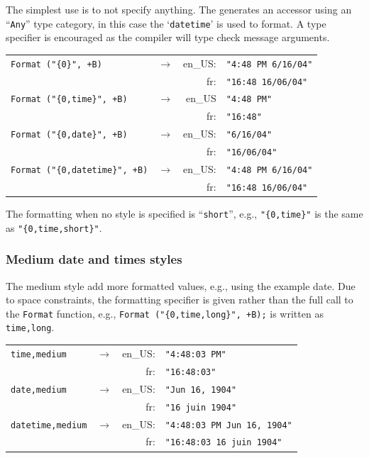 The simplest use is to not specify anything.  The generates an accessor
using an ``\texttt{Any}'' type category, in this case the `\texttt{datetime}'
is used to format.  A type specifier is encouraged as the compiler will type
check message arguments.
\begin{center}
\begin{tabular}{llrl}
\verb|Format ("{0}", +B)| & $\rightarrow$ &
                              en\_US: & \verb|"4:48 PM 6/16/04"|\\
                          & & fr: & \verb|"16:48 16/06/04"|\\
\verb|Format ("{0,time}", +B)| & $\rightarrow$ &
                              en\_US & \verb|"4:48 PM"|\\
                              & & fr: & \verb|"16:48"|\\
\verb|Format ("{0,date}", +B)| & $\rightarrow$ &
                              en\_US: & \verb|"6/16/04"|\\
                              & & fr: & \verb|"16/06/04"|\\
\verb|Format ("{0,datetime}", +B)| & $\rightarrow$ &
                              en\_US: & \verb|"4:48 PM 6/16/04"|\\
                              & & fr: & \verb|"16:48 16/06/04"|
\end{tabular}
\end{center}
The formatting when no style is specified is ``\texttt{short}'', e.g.,
\verb|"{0,time}"| is the same as \verb|"{0,time,short}"|.

\subsubsection{Medium date and times styles}

The medium style add more formatted values, e.g., using the example
date.  Due to space constraints, the formatting specifier
is given rather than the full call to the \verb|Format| function, e.g.,
\verb|Format ("{0,time,long}", +B);| is written as \verb|time,long|.
\begin{center}
\begin{tabular}{llrl}
\verb|time,medium| & $\rightarrow$ &
                        en\_US: & \verb|"4:48:03 PM"|\\
                     & & fr: & \verb|"16:48:03"|\\
\verb|date,medium| & $\rightarrow$ &
                        en\_US: & \verb|"Jun 16, 1904"|\\
                     & & fr: & \verb|"16 juin 1904"|\\
\verb|datetime,medium| & $\rightarrow$ &
                        en\_US: & \verb|"4:48:03 PM Jun 16, 1904"|\\
                     & & fr: & \verb|"16:48:03 16 juin 1904"|
\end{tabular}
\end{center}

